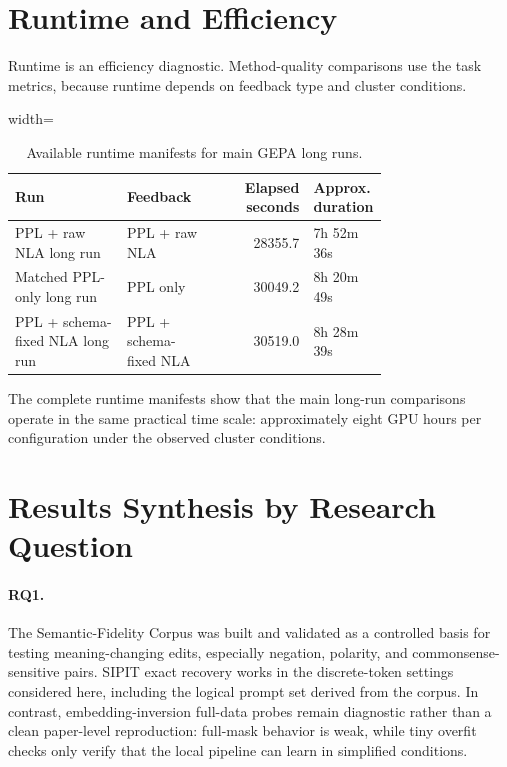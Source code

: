 \documentclass[12pt,a4paper,twoside,openright]{book}
\begin{document}
\section{Runtime and Efficiency}
\label{sec:results-runtime}

Runtime is an efficiency diagnostic. Method-quality comparisons use the task
metrics, because runtime depends on feedback type and cluster conditions.

\begin{table}[!htb]
    \centering
    \scriptsize
    \begin{adjustbox}{width=\textwidth}
    \begin{tabular}{p{0.30\linewidth} p{0.24\linewidth} r p{0.20\linewidth}}
        \toprule
        \textbf{Run} & \textbf{Feedback} & \textbf{Elapsed seconds} & \textbf{Approx. duration} \\
        \midrule
        PPL + raw NLA long run &
        PPL + raw NLA & 28355.7 & 7h 52m 36s \\
        Matched PPL-only long run &
        PPL only & 30049.2 & 8h 20m 49s \\
        PPL + schema-fixed NLA long run &
        PPL + schema-fixed NLA & 30519.0 & 8h 28m 39s \\
        \bottomrule
    \end{tabular}
    \end{adjustbox}
    \caption{Available runtime manifests for main GEPA long runs.}
    \label{tab:gepa-runtime}
\end{table}

The complete runtime manifests show that the main long-run comparisons operate
in the same practical time scale:
approximately eight GPU hours per configuration under the observed cluster
conditions.

\section{Results Synthesis by Research Question}
\label{sec:results-synthesis}

\paragraph{RQ1.}
The Semantic-Fidelity Corpus was built and validated as a controlled basis for
testing meaning-changing edits, especially negation, polarity, and
commonsense-sensitive pairs. SIPIT exact recovery works in the discrete-token
settings considered here, including the logical prompt set derived from the
corpus. In contrast, embedding-inversion full-data probes remain diagnostic
rather than a clean paper-level reproduction: full-mask behavior is weak, while
tiny overfit checks only verify that the local pipeline can learn in simplified
conditions.
\end{document}

